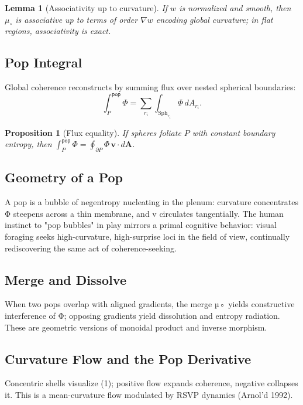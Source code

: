 \documentclass[12pt]{article}
\newtheorem{proposition}{Proposition}
\newtheorem{lemma}{Lemma}
\begin{document}
\begin{lemma}[Associativity up to curvature]
If \(w\) is normalized and smooth, then \(\mu_\circ\) is associative up to terms of order \(\nabla w\) encoding global curvature; in flat regions, associativity is exact.
\end{lemma}

\subsection{Pop Integral}
Global coherence reconstructs by summing flux over nested spherical boundaries:
\begin{equation}
\int\nolimits^{\!\!\mathsf{pop}}_{P}\Phi=\sum_{r_i}\int_{\mathrm{Sph}_{r_i}}\Phi\, dA_{r_i}.
\end{equation}

\begin{proposition}[Flux equality]
If spheres foliate \(P\) with constant boundary entropy, then \(\int^{\mathsf{pop}}_P\Phi=\oint_{\partial P}\Phi\,\mathbf{v}\cdot d\mathbf{A}\).
\end{proposition}

\subsection{Geometry of a Pop}
A pop is a bubble of negentropy nucleating in the plenum: curvature concentrates Φ steepens across a thin membrane, and v circulates tangentially. The human instinct to "pop bubbles" in play mirrors a primal cognitive behavior: visual foraging seeks high-curvature, high-surprise loci in the field of view, continually rediscovering the same act of coherence-seeking.

\subsection{Merge and Dissolve}
When two pops overlap with aligned gradients, the merge µ◦ yields constructive interference of Φ; opposing gradients yield dissolution and entropy radiation. These are geometric versions of monoidal product and inverse morphism.

\subsection{Curvature Flow and the Pop Derivative}
Concentric shells visualize (1); positive flow expands coherence, negative collapses it. This is a mean-curvature flow modulated by RSVP dynamics (Arnol’d 1992).
\end{document}

